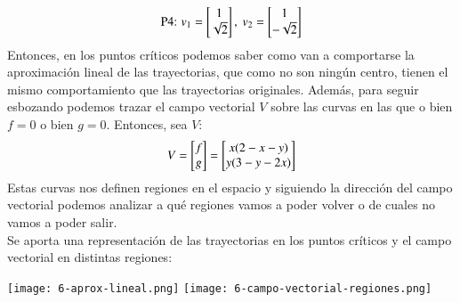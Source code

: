 \begin{eg}
\begin{gather*}
        \text{P4: } v_1 = \mx{1\\ \sqrt{2}},\ v_2 = \mx{1\\-\sqrt{2}}\\
    \end{gather*}
    Entonces, en los puntos críticos podemos saber como van a comportarse la aproximación lineal de las trayectorias, que como no son ningún centro, tienen el mismo comportamiento que las trayectorias originales.
    Además, para seguir esbozando podemos trazar el campo vectorial $V$ sobre las curvas en las que o bien $f = 0$ o bien $g = 0$. Entonces, sea $V$:
    $$
        V = \mx{f\\g} = \mx{x(2-x-y)\\y(3-y-2x)}
    $$
    Estas curvas nos definen regiones en el espacio y siguiendo la dirección del campo vectorial podemos analizar a qué regiones vamos a poder volver o de cuales no vamos a poder salir.\\
    Se aporta una representación de las trayectorias en los puntos críticos y el campo vectorial en distintas regiones:
    \begin{center}
        \texttt{[image: 6-aprox-lineal.png]}
        \texttt{[image: 6-campo-vectorial-regiones.png]}
    \end{center}
\end{eg}
